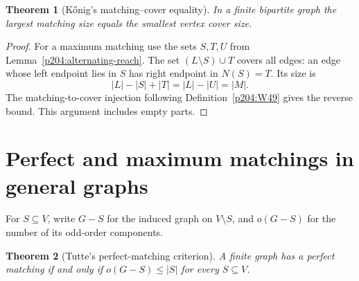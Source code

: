 \documentclass[11pt,oneside,openany]{book}
\theoremstyle{plain}
\newtheorem{theorem}{Theorem}[chapter]
\theoremstyle{definition}
\theoremstyle{remark}
\begin{document}
\begin{theorem}[K\H{o}nig's matching--cover equality]\label{p204:W52}
In a finite bipartite graph the largest matching size equals the
smallest vertex cover size.
\end{theorem}

\begin{proof}
For a maximum matching use the sets \(S,T,U\) from
Lemma~\ref{p204:alternating-reach}. The set
\((L\setminus S)\cup T\) covers all edges: an edge whose left
endpoint lies in \(S\) has right endpoint in \(N(S)=T\).
Its size is
\[
 |L|-|S|+|T|=|L|-|U|=|M|.
\]
The matching-to-cover injection following Definition~\ref{p204:W49}
gives the reverse bound. This argument includes empty parts.
\end{proof}

\section{Perfect and maximum matchings in general graphs}

For \(S\subseteq V\), write \(G-S\) for the induced graph on
\(V\setminus S\), and \(o(G-S)\) for the number of its odd-order
components.

\begin{theorem}[Tutte's perfect-matching criterion]\label{p204:W53}
A finite graph has a perfect matching if and only if
\(o(G-S)\leq |S|\) for every \(S\subseteq V\).
\end{theorem}
\end{document}
